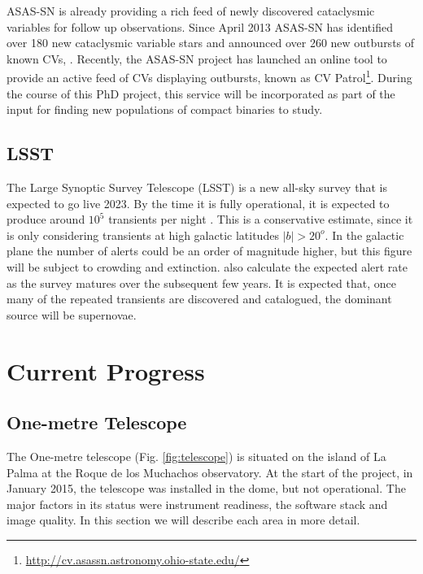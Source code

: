 \documentclass[a4paper,fleqn,usenatbib]{mnras}
\begin{document}
ASAS-SN is already providing a rich feed of newly discovered cataclysmic variables for follow up observations. Since April 2013 ASAS-SN has identified over 180 new cataclysmic variable stars and announced over 260 new outbursts of known CVs, \citep{Davis2015}. Recently, the ASAS-SN project has launched an online tool to provide an active feed of CVs displaying outbursts, known as CV Patrol\footnote{\url{http://cv.asassn.astronomy.ohio-state.edu/}}.  During the course of this PhD project, this service will be incorporated as part of the input for finding new populations of compact binaries to study.  

\subsection{LSST}
The Large Synoptic Survey Telescope (LSST) is a new all-sky survey that is expected to go live 2023. By the time it is fully operational, it is expected to produce around $10^5$ transients per night \citep{Ridgway2014}. This is a conservative estimate, since it is only considering transients at high galactic latitudes $|b| > 20^o$. In the galactic plane the number of alerts could be an order of magnitude higher, but this figure will be subject to crowding and extinction. \citet{Ridgway2014} also calculate the expected alert rate as the survey matures over the subsequent few years. It is expected that, once many of the repeated transients are discovered and catalogued, the dominant source will be supernovae. 


\section{Current Progress}

\subsection{One-metre Telescope}
The One-metre telescope (Fig. \ref{fig:telescope}) is situated on the island of La Palma at the Roque de los Muchachos observatory. At the start of the project, in January 2015, the telescope was installed in the dome, but not operational. The major factors in its status were instrument readiness, the software stack and image quality. In this section we will describe each area in more detail. 
\end{document}

